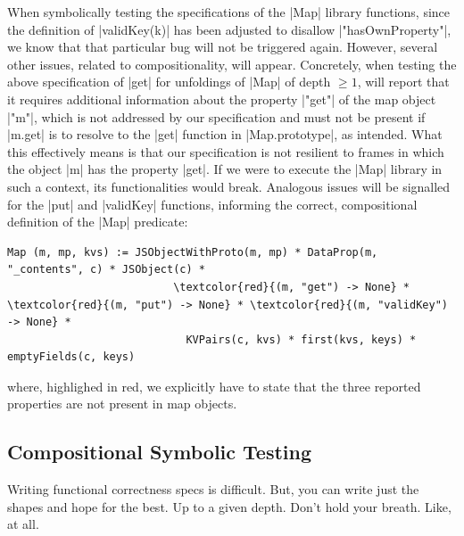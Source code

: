 \bigskip
When symbolically testing the specifications of the \jsinline|Map| library functions, since the definition of \jsinline|validKey(k)| has been adjusted to disallow \jsinline|"hasOwnProperty"|, we know that that particular bug will not be triggered again. However, several other issues, related to compositionality, will appear. Concretely, when testing the above specification of \jsinline|get| for unfoldings of \jsinline|Map| of depth $\geq 1$, \cosette will report that it requires additional information about the property \jsinline|"get"| of the map object \jsinline|"m"|, which is not addressed by our specification and must not be present if \jsinline|m.get| is to resolve to the \jsinline|get| function in \jsinline|Map.prototype|, as intended. What this effectively means is that our specification is not resilient to frames in which the object \jsinline|m| has the property \jsinline|get|. If we were to execute the \jsinline|Map| library in such a context, its functionalities would break.
Analogous issues will be signalled for the \jsinline|put| and \jsinline|validKey| functions, informing the correct, compositional definition of the \jsinline|Map| predicate:

\smallskip
\begin{Verbatim}[fontsize=\footnotesize,commandchars=\\\{\}]
    Map (m, mp, kvs) := JSObjectWithProto(m, mp) * DataProp(m, "_contents", c) * JSObject(c) * 
                          \textcolor{red}{(m, "get") -> None} * \textcolor{red}{(m, "put") -> None} * \textcolor{red}{(m, "validKey") -> None} * 
                            KVPairs(c, kvs) * first(kvs, keys) * emptyFields(c, keys)
\end{Verbatim} 

\smallskip
\noindent where, highlighed in red, we explicitly have to state that the three reported properties are not present in map objects. 



\subsection{Compositional Symbolic Testing}
Writing functional correctness specs is difficult. But, you can write just the shapes and hope for the best. Up to a given depth. Don't hold your breath. Like, at all.

\newpage


